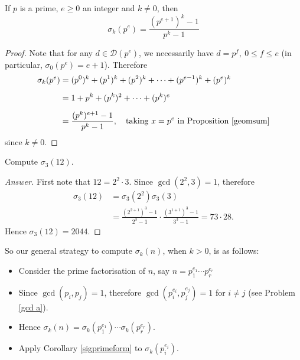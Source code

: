\vspace*{1em}

\begin{corollary}\label{sigprimeform}
If $p$ is a prime, $e \geq 0$ an integer and $k \neq 0$, then
\[\sigma_k(p^e) = \frac{(p^{e+1})^k - 1}{p^k - 1}\]
\end{corollary}
\begin{proof}
Note that for any $d \in \mathscr{D}(p^e)$, we necessarily have $d = p^f,\ 0 \leq f \leq e$ (in particular, $\sigma_0(p^e) = e + 1$). Therefore
\begin{align*}
\sigma_k(p^e) &= (p^0)^k + (p^1)^k + (p^2)^k + \cdots + (p^{e-1})^k + (p^e)^k\\[0.5em]
&= 1 + p^k + (p^k)^2 + \cdots + (p^k)^e\\[0.5em]
&= \frac{(p^k)^{e+1} - 1}{p^k - 1},\quad \text{taking $x = p^e$ in Proposition \ref{geomsum}}
\end{align*}
since $k \neq 0$.
\end{proof}

\vspace*{1em}

\begin{example}
Compute $\sigma_3(12)$.
\end{example}
\begin{proof}[Answer]
First note that $12 = 2^2\cdot 3$. Since $\gcd(2^2,3) = 1$, therefore 
\begin{align*}
\sigma_3(12) &= \sigma_3(2^2)\sigma_3(3)\\[0.5em]
&= \frac{(2^{2+1})^3 - 1}{2^3 - 1}\cdot\frac{(3^{1+1})^3 - 1}{3^3 - 1} = 73\cdot 28.
\end{align*}
Hence $\sigma_3(12) = 2044$.
\end{proof}

\vspace*{1em}

So our general strategy to compute $\sigma_k(n)$, when $k>0$, is as follows:
\begin{itemize}
\item Consider the prime factorisation of $n$, say $n = p_1^{e_1}\cdots p_r^{e_r}$
\item Since $\gcd(p_i,p_j) = 1$, therefore $\gcd(p_i^{e_i},p_j^{e_j}) = 1$ for $i \neq j$ (see Problem \ref{gcd a}).
\item Hence $\sigma_k(n) = \sigma_k(p_1^{e_1})\cdots\sigma_k(p_r^{e_r})$.
\item Apply Corollary \ref{sigprimeform} to $\sigma_k(p_i^{e_i})$.
\end{itemize}

